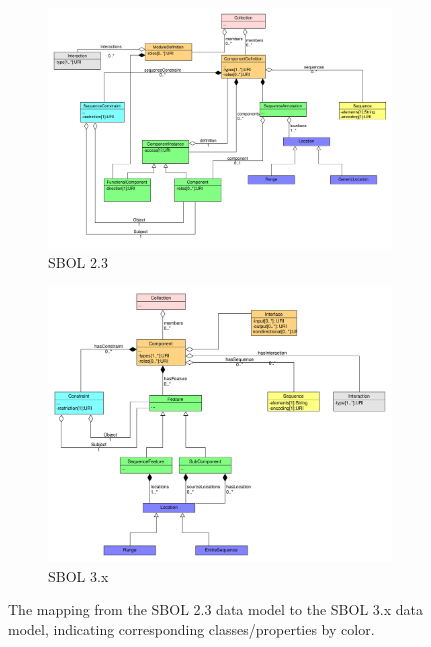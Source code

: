 \begin{figure}[h]
	\begin{subfigure}{.5\textwidth}
		\centering
		\includegraphics[width=\linewidth]{images/sbol_v2_to_v3_left_subfigure}  
		\caption{SBOL 2.3}
		\label{fig:sub-first}
	\end{subfigure}\begin{subfigure}{.5\textwidth}
		\centering
		\includegraphics[width=\linewidth]{images/sbol_v2_to_v3_right_subfigure}  
		\caption{SBOL 3.x}
		\label{fig:sub-second}
	\end{subfigure}
	\caption{\label{SBOL2TO3}The mapping from the SBOL 2.3 data model to the SBOL 3.x  data model, indicating corresponding classes/properties by color.}
\end{figure}
